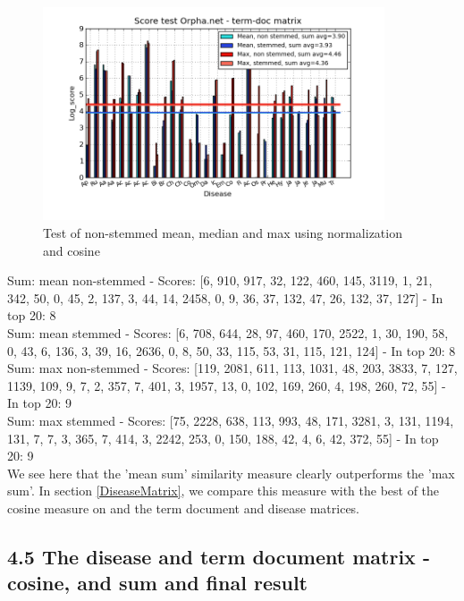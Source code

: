 \begin{figure}[h!]
        \begin{center}
          \includegraphics[width=0.9\textwidth]{barcharts/termDoc_orphan_hist_3000_ns_s_mea_max_sum.png}
        \end{center}
        \caption{Test of non-stemmed mean, median and max using normalization and cosine}
        \label{termDoc_orphan_hist_3000_ns_s_mea_max_sum}
\end{figure} 
 
Sum: mean non-stemmed - Scores: [6, 910, 917, 32, 122, 460, 145, 3119, 1, 21, 342, 50, 0, 45, 2, 137, 3, 44, 14, 2458, 0, 9, 36, 37, 132, 47, 26, 132, 37, 127] - In top 20: 8 \\
Sum: mean stemmed - Scores: [6, 708, 644, 28, 97, 460, 170, 2522, 1, 30, 190, 58, 0, 43, 6, 136, 3, 39, 16, 2636, 0, 8, 50, 33, 115, 53, 31, 115, 121, 124] - In top 20: 8 \\
Sum: max non-stemmed - Scores: [119, 2081, 611, 113, 1031, 48, 203, 3833, 7, 127, 1139, 109, 9, 7, 2, 357, 7, 401, 3, 1957, 13, 0, 102, 169, 260, 4, 198, 260, 72, 55] - In top 20: 9 \\
Sum: max stemmed - Scores: [75, 2228, 638, 113, 993, 48, 171, 3281, 3, 131, 1194, 131, 7, 7, 3, 365, 7, 414, 3, 2242, 253, 0, 150, 188, 42, 4, 6, 42, 372, 55] - In top 20: 9 \\

We see here that the 'mean sum' similarity measure clearly outperforms the 'max sum'. In section \ref{DiseaseMatrix}, we compare this measure with the best of the cosine measure on and the term document and disease matrices.

\subsection{4.5 The disease and term document matrix - cosine,  and sum and final result}

